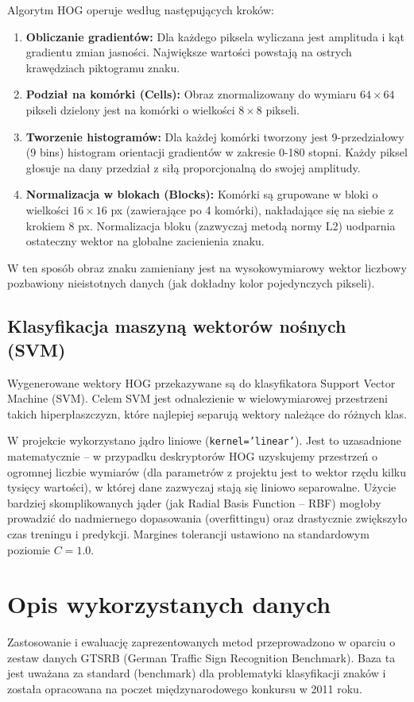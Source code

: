 \documentclass[12pt,a4paper]{article}
\begin{document}
Algorytm HOG operuje według następujących kroków:
\begin{enumerate}
    \item \textbf{Obliczanie gradientów:} Dla każdego piksela wyliczana jest amplituda i kąt gradientu zmian jasności. Największe wartości powstają na ostrych krawędziach piktogramu znaku.
    \item \textbf{Podział na komórki (Cells):} Obraz znormalizowany do wymiaru $64\times64$ pikseli dzielony jest na komórki o wielkości $8\times8$ pikseli.
    \item \textbf{Tworzenie histogramów:} Dla każdej komórki tworzony jest 9-przedziałowy (9 bins) histogram orientacji gradientów w zakresie 0-180 stopni. Każdy piksel głosuje na dany przedział z siłą proporcjonalną do swojej amplitudy.
    \item \textbf{Normalizacja w blokach (Blocks):} Komórki są grupowane w bloki o wielkości $16\times16$ px (zawierające po 4 komórki), nakładające się na siebie z krokiem 8 px. Normalizacja bloku (zazwyczaj metodą normy L2) uodparnia ostateczny wektor na globalne zacienienia znaku.
\end{enumerate}
W ten sposób obraz znaku zamieniany jest na wysokowymiarowy wektor liczbowy pozbawiony nieistotnych danych (jak dokładny kolor pojedynczych pikseli).


\subsection{Klasyfikacja maszyną wektorów nośnych (SVM)}
Wygenerowane wektory HOG przekazywane są do klasyfikatora Support Vector Machine (SVM). Celem SVM jest odnalezienie w wielowymiarowej przestrzeni takich hiperpłaszczyzn, które najlepiej separują wektory należące do różnych klas.

W projekcie wykorzystano jądro liniowe (\texttt{kernel='linear'}). Jest to uzasadnione matematycznie -- w przypadku deskryptorów HOG uzyskujemy przestrzeń o ogromnej liczbie wymiarów (dla parametrów z projektu jest to wektor rzędu kilku tysięcy wartości), w której dane zazwyczaj stają się liniowo separowalne. Użycie bardziej skomplikowanych jąder (jak Radial Basis Function -- RBF) mogłoby prowadzić do nadmiernego dopasowania (overfittingu) oraz drastycznie zwiększyło czas treningu i predykcji. Margines tolerancji ustawiono na standardowym poziomie $C=1.0$.


\section{Opis wykorzystanych danych}
Zastosowanie i ewaluację zaprezentowanych metod przeprowadzono w oparciu o zestaw danych GTSRB (German Traffic Sign Recognition Benchmark). Baza ta jest uważana za standard (benchmark) dla problematyki klasyfikacji znaków i została opracowana na poczet międzynarodowego konkursu w 2011 roku.
\end{document}
